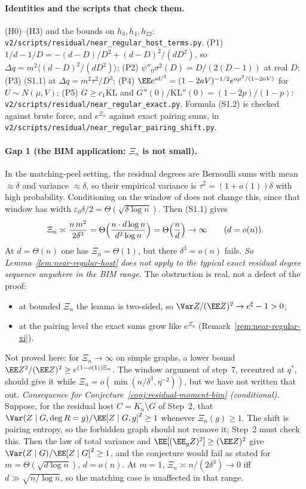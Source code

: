 \paragraph{Identities and the scripts that check them.}
(H0)--(H3) and the bounds on \(h_3,h_4,h_{22}\):
\texttt{v2/scripts/residual/near\_regular\_host\_terms.py}.
(P1) \(1/d-1/D=-(d-D)/D^2+(d-D)^2/(dD^2)\), so \(\Delta q=m^2\langle(d-D)^2/(dD^2)\rangle\);
(P2) \(\psi''_0\sigma^2(D)=D/(2(D-1))\) at real \(D\);
(P3) (S1.1) at \(\Delta q=m^2\tau^2/D^3\);
(P4) \(\EE e^{aU^2}=(1-2aV)^{-1/2}e^{a\mu^2/(1-2aV)}\) for \(U\sim N(\mu,V)\);
(P5) \(G\ge c_1\mathrm{KL}\) and \(G''(0)/\mathrm{KL}''(0)=(1-2p)/(1-p)\):
\texttt{v2/scripts/residual/near\_regular\_exact.py}.
Formula (S1.2) is checked against brute force, and \(e^{\Xi_n}\) against exact pairing sums, in
\texttt{v2/scripts/residual/near\_regular\_pairing\_shift.py}.

\paragraph{Gap 1 (the BIM application: \(\Xi_n\) is not small).}
In the matching-peel setting, the residual degrees are Bernoulli sums with
mean \(\approx\delta\) and variance \(\approx\delta\), so their empirical variance
is \(\tau^2=(1+o(1))\delta\) with high probability. Conditioning on the window of
\cite{PlusOneV1} does not change this, since that window has width
\(\varepsilon_0\delta/2=\Theta(\sqrt{\delta\log n})\). Then (S1.1) gives
\[
\Xi_n\asymp\frac{n\,m^2}{2\delta^3}
=\Theta\Bigl(\frac{n\cdot d\log n}{d^2\log n}\Bigr)=\Theta\Bigl(\frac nd\Bigr)\to\infty
\qquad(d=o(n)).
\]
At \(d=\Theta(n)\) one has \(\Xi_n=\Theta(1)\), but there \(\delta^3=o(n)\) fails.
\emph{So Lemma~\ref{lem:near-regular-host} does not apply to the typical exact
residual degree sequence anywhere in the BIM range.} The obstruction is real,
not a defect of the proof:
\begin{itemize}
\item at bounded \(\Xi_n\) the lemma is two-sided, so \(\Var Z/(\EE Z)^2\to e^\xi-1>0\);
\item at the pairing level the exact sums grow like \(e^{\Xi_n}\) (Remark~\ref{rem:near-regular-xi}).
\end{itemize}
Not proved here: for \(\Xi_n\to\infty\) on simple graphs, a lower bound
\(\EE Z^2/(\EE Z)^2\ge e^{(1-o(1))\Xi_n}\). The window argument of step~7,
recentred at \(q^*\), should give it while \(\Xi_n=o(\min(n/\delta^3,\eta^{-2}))\), but
we have not written that out.
\emph{Consequence for Conjecture~\ref{conj:residual-moment-bim} (conditional).}
Suppose, for the residual host \(C=K_n\setminus G\) of Step~2, that
\(\Var(Z\mid G,\deg R=g)/\EE[Z\mid G,g]^2\ge1\) whenever \(\Xi_n(g)\ge1\).
The shift is pairing entropy, so the forbidden graph should not remove it;
Step~2 must check this. Then the law of total variance and
\(\EE[(\EE_gZ)^2]\ge(\EE Z)^2\) give
\(\Var(Z\mid G)/\EE[Z\mid G]^2\ge1\), and the conjecture would fail as stated
for \(m=\Theta(\sqrt{d\log n})\), \(d=o(n)\). At \(m=1\),
\(\Xi_n\asymp n/(2\delta^3)\to0\) iff \(d\gg\sqrt{n/\log n}\), so the
matching case is unaffected in that range.

